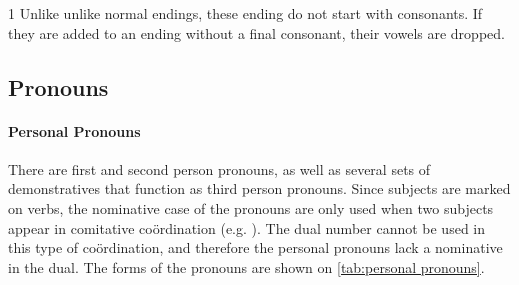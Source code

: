 \begin{table}[h]
\centering
\caption{Noun Endings}
\label{tab:noun endings}
\begin{threeparttable}
\begin{tablenotes}
\item[1] Unlike unlike normal endings, these ending do not start with
    consonants. If they are added to an ending without a final consonant, their
    vowels are dropped.
\end{tablenotes}
\end{threeparttable}
\end{table}

\subsection{Pronouns}
\paragraph{Personal Pronouns} There are first and second person pronouns, as
well as several sets of demonstratives that function as third person pronouns.
Since subjects are marked on verbs, the nominative case of the pronouns are
only used when two subjects appear in comitative coördination (e.g. ). The dual number cannot be used in this type of coördination,
and therefore the personal pronouns lack a nominative in the dual. The forms of
the pronouns are shown on \cref{tab:personal pronouns}.

